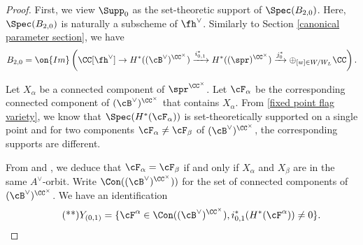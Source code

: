 \documentclass[12pt]{amsart}
\begin{document}
\begin{proof}
    First, we view $\Supp_0$ as the set-theoretic support of $\Spec(B_{2,0})$. Here, $\Spec(B_{2,0})$ is naturally a subscheme of $\fh^\vee$. Similarly to Section \ref{canonical parameter section}, we have 
$$B_{2,0}= \on{Im} \left (\CC[\fh^\vee]\rightarrow H^*((\cB^\vee)^{\CC^\times})\xrightarrow{i^*_{0, 1}} H^*((\spr)^{ \CC^\times})\xrightarrow{j^*_{0}} \oplus_{[w]\in W/W_{L}} \CC\right ).$$

    Let $X_{\alpha}$ be a connected component of $\spr^{\CC^\times}$. Let $\cF_\alpha$ be the corresponding connected component of $(\cB^\vee)^{\CC^\times}$ that contains $X_\alpha$. From \cref{fixed point flag variety}, we know that $\Spec(H^*(\cF_\alpha))$ is set-theoretically supported on a single point and for two components $\cF_\alpha\neq \cF_\beta$ of $(\cB^\vee)^{\CC^\times}$, the corresponding supports are different. %
    
    From \cite[Section 3.7]{DLP} and \cite[Section 2.1]{DLP}, we deduce that $\cF_\alpha= \cF_\beta$ if and only if $X_\alpha$ and $X_\beta$ are in the same $A^\vee$-orbit. Write $\Con((\cB^\vee)^{\CC^\times}))$ for the set of connected components of $(\cB^\vee)^{\CC^\times}$. We have an identification
    \begin{equation*} \label{components to component} \tag{**}
        Y_{(0,1)}= \{\cF^{\alpha}\in \Con((\cB^\vee)^{\CC^\times}), i^*_{0,1}(H^*(\cF^{\alpha}))\neq 0\}.
    \end{equation*}
    

    

\end{proof}
\end{document}
